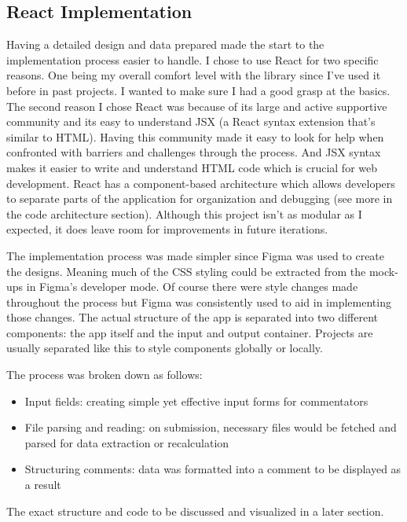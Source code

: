 \documentclass[10pt,twocolumn]{article}
\begin{document}
\subsection{React Implementation}

Having a detailed design and data prepared made the start to the implementation process easier to handle. I chose to use React for two specific reasons. One being my overall comfort level with the library since I've used it before in past projects. I wanted to make sure I had a good grasp at the basics. The second reason I chose React was because of its large and active supportive community and its easy to understand JSX (a React syntax extension that's similar to HTML). Having this community made it easy to look for help when confronted with barriers and challenges through the process. And JSX syntax makes it easier to write and understand HTML code which is crucial for web development. React has a component-based architecture which allows developers to separate parts of the application for organization and debugging (see more in the code architecture section). Although this project isn't as modular as I expected, it does leave room for improvements in future iterations.

The implementation process was made simpler since Figma was used to create the designs. Meaning much of the CSS styling could be extracted from the mock-ups in Figma’s developer mode. Of course there were style changes made throughout the process but Figma was consistently used to aid in implementing those changes. The actual structure of the app is separated into two different components: the app itself and the input and output container. Projects are usually separated like this to style components globally or locally. 

The process was broken down as follows: 

\begin{itemize}
    \item Input fields: creating simple yet effective input forms for commentators
    \item File parsing and reading: on submission, necessary files would be fetched and parsed for data extraction or recalculation
    \item Structuring comments: data was formatted into a comment to be displayed as a result
\end{itemize}

The exact structure and code to be discussed and visualized in a later section.
\end{document}
